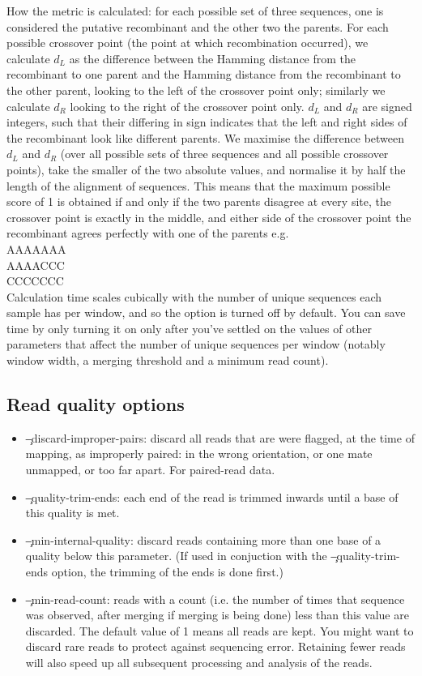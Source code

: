 \begin{itemize}
How the metric is calculated: for each possible set of three sequences, one is considered the putative recombinant and the other two the parents.
For each possible crossover point (the point at which recombination occurred), we calculate $d_L$ as the difference between the Hamming distance from the recombinant to one parent and the Hamming distance from the recombinant to the other parent, looking to the left of the crossover point only; similarly we calculate $d_R$ looking to the right of the crossover point only.
$d_L$ and $d_R$ are signed integers, such that their differing in sign indicates that the left and right sides of the recombinant look like different parents.
We maximise the difference between $d_L$ and $d_R$ (over all possible sets of three sequences and all possible crossover points), take the smaller of the two absolute values, and normalise it by half the length of the alignment of sequences.
This means that the maximum possible score of 1 is obtained if and only if the two parents disagree at every site, the crossover point is exactly in the middle, and either side of the crossover point the recombinant agrees perfectly with one of the parents e.g.\\
AAAAAAA\\
AAAACCC\\
CCCCCCC\\
Calculation time scales cubically with the number of unique sequences each sample has per window, and so the option is turned off by default.
You can save time by only turning it on only after you've settled on the values of other parameters that affect the number of unique sequences per window (notably window width, a merging threshold and a minimum
read count).
\end{itemize}

\subsection{Read quality options}
\begin{itemize}
\item \c{--discard-improper-pairs}: discard all reads that are were flagged, at the time of mapping, as improperly paired: in the wrong orientation, or one mate unmapped, or too far apart.
For paired-read data.
\item \c{--quality-trim-ends}: each end of the read is trimmed inwards until a base of this quality is met.
\item \c{--min-internal-quality}: discard reads containing more than one base of a quality below this
parameter.
(If used in conjuction with the \c{--quality-trim-ends option}, the trimming of the ends is done first.)
\item \c{--min-read-count}: reads with a count (i.e. the number of times that sequence was observed,
after merging if merging is being done) less than this value are discarded.
The default value of 1 means all reads are kept.
You might want to discard rare reads to protect against sequencing error.
Retaining fewer reads will also speed up all subsequent processing and analysis of the reads.
\end{itemize}

